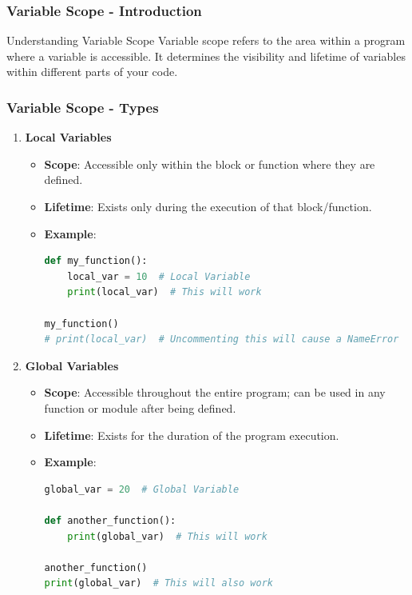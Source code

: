 \documentclass{beamer}
\begin{document}
\begin{frame}[fragile]
    \frametitle{Variable Scope - Introduction}
    \begin{block}{Understanding Variable Scope}
        Variable scope refers to the area within a program where a variable is accessible. It determines the visibility and lifetime of variables within different parts of your code.
    \end{block}
\end{frame}

\begin{frame}[fragile]
    \frametitle{Variable Scope - Types}
    \begin{enumerate}
        \item \textbf{Local Variables}
        \begin{itemize}
            \item \textbf{Scope}: Accessible only within the block or function where they are defined.
            \item \textbf{Lifetime}: Exists only during the execution of that block/function.
            \item \textbf{Example}:
            \begin{lstlisting}[language=Python]
def my_function():
    local_var = 10  # Local Variable
    print(local_var)  # This will work

my_function()
# print(local_var)  # Uncommenting this will cause a NameError
            \end{lstlisting}
        \end{itemize}
        \item \textbf{Global Variables}
        \begin{itemize}
            \item \textbf{Scope}: Accessible throughout the entire program; can be used in any function or module after being defined.
            \item \textbf{Lifetime}: Exists for the duration of the program execution.
            \item \textbf{Example}:
            \begin{lstlisting}[language=Python]
global_var = 20  # Global Variable

def another_function():
    print(global_var)  # This will work

another_function()
print(global_var)  # This will also work
            \end{lstlisting}
        \end{itemize}
    \end{enumerate}
\end{frame}
\end{document}
